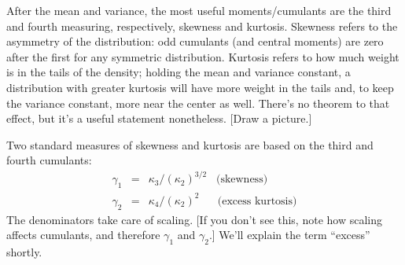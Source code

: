 \documentclass[11pt]{article}
\begin{document}
After the mean and variance, the most useful moments/cumulants
are the third and fourth measuring, respectively,
skewness and kurtosis.
Skewness refers to the asymmetry of the distribution:
odd cumulants (and central moments) are zero after the first
for any symmetric distribution.
Kurtosis refers to how much weight is in the tails of the density;
holding the mean and variance constant, a distribution
with greater kurtosis will have more weight in the tails and,
to keep the variance constant, more near the center as well.
There's no theorem to that effect, but it's a useful statement nonetheless.
[Draw a picture.]

Two standard measures of skewness and kurtosis
are based on the third and fourth cumulants:
\begin{eqnarray*}
    \gamma_1 &=& \kappa_3 /(\kappa_2)^{3/2} \;\;\; \mbox{(skewness)}\\
    \gamma_2 &=& \kappa_4 /(\kappa_2)^2 \;\;\;\;\;\; \mbox{(excess kurtosis)}
\end{eqnarray*}
The denominators take care of scaling.
[If you don't see this, note how scaling affects cumulants,
and therefore $\gamma_1$ and $\gamma_2$.]
We'll explain the term ``excess'' shortly.

\end{document}
